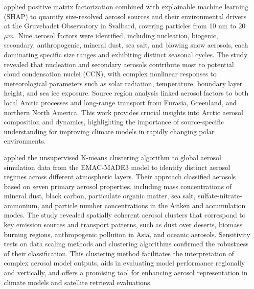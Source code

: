 \documentclass[11pt]{article}
\begin{document}
\citet{song2022understanding} applied positive matrix factorization combined with explainable machine learning (SHAP) to quantify size-resolved aerosol sources and their environmental drivers at the Gruvebadet Observatory in Svalbard, covering particles from 10 nm to 20 \(\mu m\). Nine aerosol factors were identified, including nucleation, biogenic, secondary, anthropogenic, mineral dust, sea salt, and blowing snow aerosols, each dominating specific size ranges and exhibiting distinct seasonal cycles. The study revealed that nucleation and secondary aerosols contribute most to potential cloud condensation nuclei (CCN), with complex nonlinear responses to meteorological parameters such as solar radiation, temperature, boundary layer height, and sea ice exposure. Source region analysis linked aerosol factors to both local Arctic processes and long-range transport from Eurasia, Greenland, and northern North America. This work provides crucial insights into Arctic aerosol composition and dynamics, highlighting the importance of source-specific understanding for improving climate models in rapidly changing polar environments.

\citet{li2022aerosol} applied the unsupervised K-means clustering algorithm to global aerosol simulation data from the EMAC-MADE3 model to identify distinct aerosol regimes across different atmospheric layers. Their approach classified aerosols based on seven primary aerosol properties, including mass concentrations of mineral dust, black carbon, particulate organic matter, sea salt, sulfate-nitrate-ammonium, and particle number concentrations in the Aitken and accumulation modes. The study revealed spatially coherent aerosol clusters that correspond to key emission sources and transport patterns, such as dust over deserts, biomass burning regions, anthropogenic pollution in Asia, and oceanic aerosols. Sensitivity tests on data scaling methods and clustering algorithms confirmed the robustness of their classification. This clustering method facilitates the interpretation of complex aerosol model outputs, aids in evaluating model performance regionally and vertically, and offers a promising tool for enhancing aerosol representation in climate models and satellite retrieval evaluations.
\end{document}
